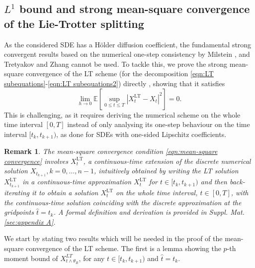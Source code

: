 \documentclass[a4paper,12pt]{article}
\numberwithin{equation}{section}
\theoremstyle{plain}
\newtheorem{remark}{Remark}
\theoremstyle{definition}
\begin{document}
\subsection{$L^1$ bound and strong mean-square convergence of the Lie-Trotter splitting}\label{Section3.1} 
As the considered SDE has a H\"older diffusion coefficient, the fundamental strong convergent results based on the numerical one-step consistency by Milstein \cite{milshtejn_approximate_1975,milstein_numerical_1995}, and Tretyakov and Zhang \cite{tretyakov_fundamental_2013} cannot be used. 
To tackle this, we prove the strong mean-square convergence  of the LT scheme (for the decomposition \eqref{eqn:LT subequations}-\eqref{eqn:LT subequations2}) directly \cite{higham_strong_2002}, showing that it  satisfies \begin{equation}\label{eqn:mean-square convergence}
         \lim_{h\rightarrow 0}\mathbb{E}\left[\sup_{0\leq t \leq T}\left|X^{\textrm{LT}}_t-X_t\right|^2\right]=0.
     \end{equation} 
This is challenging,  as it requires deriving the numerical scheme on the whole time interval $[0,T]$ instead of only  analysing its one-step behaviour 
on the time interval $[t_k,t_{k+1})$, as done for SDEs with one-sided Lipschitz coefficients. 
\begin{remark}
The mean-square convergence condition \eqref{eqn:mean-square convergence} involves  $X^{\textrm{LT}}_t$, a continuous-time extension of the discrete numerical solution $X_{t_{k+1}}, k=0,\ldots, n-1$, intuitively obtained by writing the LT solution $X_{t_{k+1}}^{\textrm{LT}}$ in a continuous-time approximation $X_t^{\textrm{LT}}$ for $t\in [t_k,t_{k+1})$ and then back-iterating it to obtain a solution $X^{\textrm{LT}}_t$ on the whole time interval, $t\in[0,T]$, with the continuous-time solution coinciding with the discrete approximation at the gridpoints $\hat t=t_k$. A formal definition and derivation is provided in Suppl. Mat. \ref{sec:appendix A}.
\end{remark} 
We start by stating two results which will be needed in the proof of the mean-square convergence of the LT scheme. The first is a lemma showing the $p$-th moment bound of $X^{LT}_{t \wedge \theta_R}$, for any $t\in [t_k,t_{k+1})$ and $\hat t=t_k$.
\end{document}
